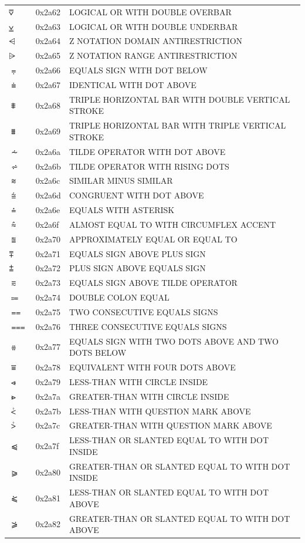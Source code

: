 \documentclass[12pt, twoside]{article}
\begin{document}
\begin{longtable}{L{1.0cm} L{2.0cm} >{\footnotesize}L{10cm}}
$⩢$&0x2a62&LOGICAL OR WITH DOUBLE OVERBAR\\
$⩣$&0x2a63&LOGICAL OR WITH DOUBLE UNDERBAR\\
$⩤$&0x2a64&Z NOTATION DOMAIN ANTIRESTRICTION\\
$⩥$&0x2a65&Z NOTATION RANGE ANTIRESTRICTION\\
$⩦$&0x2a66&EQUALS SIGN WITH DOT BELOW\\
$⩧$&0x2a67&IDENTICAL WITH DOT ABOVE\\
$⩨$&0x2a68&TRIPLE HORIZONTAL BAR WITH DOUBLE VERTICAL STROKE\\
$⩩$&0x2a69&TRIPLE HORIZONTAL BAR WITH TRIPLE VERTICAL STROKE\\
$⩪$&0x2a6a&TILDE OPERATOR WITH DOT ABOVE\\
$⩫$&0x2a6b&TILDE OPERATOR WITH RISING DOTS\\
$⩬$&0x2a6c&SIMILAR MINUS SIMILAR\\
$⩭$&0x2a6d&CONGRUENT WITH DOT ABOVE\\
$⩮$&0x2a6e&EQUALS WITH ASTERISK\\
$⩯$&0x2a6f&ALMOST EQUAL TO WITH CIRCUMFLEX ACCENT\\
$⩰$&0x2a70&APPROXIMATELY EQUAL OR EQUAL TO\\
$⩱$&0x2a71&EQUALS SIGN ABOVE PLUS SIGN\\
$⩲$&0x2a72&PLUS SIGN ABOVE EQUALS SIGN\\
$⩳$&0x2a73&EQUALS SIGN ABOVE TILDE OPERATOR\\
$⩴$&0x2a74&DOUBLE COLON EQUAL\\
$⩵$&0x2a75&TWO CONSECUTIVE EQUALS SIGNS\\
$⩶$&0x2a76&THREE CONSECUTIVE EQUALS SIGNS\\
$⩷$&0x2a77&EQUALS SIGN WITH TWO DOTS ABOVE AND TWO DOTS BELOW\\
$⩸$&0x2a78&EQUIVALENT WITH FOUR DOTS ABOVE\\
$⩹$&0x2a79&LESS-THAN WITH CIRCLE INSIDE\\
$⩺$&0x2a7a&GREATER-THAN WITH CIRCLE INSIDE\\
$⩻$&0x2a7b&LESS-THAN WITH QUESTION MARK ABOVE\\
$⩼$&0x2a7c&GREATER-THAN WITH QUESTION MARK ABOVE\\
$⩿$&0x2a7f&LESS-THAN OR SLANTED EQUAL TO WITH DOT INSIDE\\
$⪀$&0x2a80&GREATER-THAN OR SLANTED EQUAL TO WITH DOT INSIDE\\
$⪁$&0x2a81&LESS-THAN OR SLANTED EQUAL TO WITH DOT ABOVE\\
$⪂$&0x2a82&GREATER-THAN OR SLANTED EQUAL TO WITH DOT ABOVE\\

\end{longtable}
\end{document}
